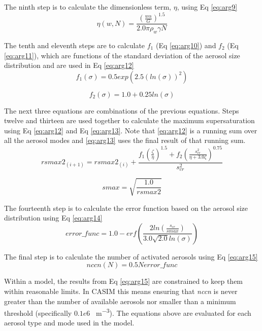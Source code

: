 The ninth step is to calculate the dimensionless term, $\eta$, using Eq \ref{eq:arg9}
\begin{equation} \label{eq:arg9}
\eta(w,N) = \frac{(\frac{w \alpha}{G})^{1.5}}{2.0 \pi \rho_w \gamma N}
\end{equation}

The tenth and eleventh steps are to calculate $f_1$ (Eq \ref{eq:arg10}) and $f_2$ (Eq \ref{eq:arg11}), which are functions of the standard deviation of the aerosol size distribution and are used in Eq \ref{eq:arg12}
\begin{equation} \label{eq:arg10}
f_1(\sigma) = 0.5 exp(2.5(ln(\sigma))^{2})
\end{equation}

\begin{equation} \label{eq:arg11}
f_2(\sigma) = 1.0 + 0.25ln(\sigma)
\end{equation}

The next three equations are combinations of the previous equations. Steps twelve and thirteen are used together to calculate the maximum supersaturation using Eq \ref{eq:arg12} and Eq \ref{eq:arg13}. Note that \ref{eq:arg12} is a running sum over all the aerosol modes and \ref{eq:arg13} uses the final result of that running sum.
\begin{equation} \label{eq:arg12}
rsmax2_{(i+1)} = rsmax2_{(i)} + \frac{f_1(\frac{\zeta}{\eta})^{1.5} + f_2(\frac{s_{cr}^{2}}{\eta + 3.0\zeta})^{0.75}}{s_{cr}^{2}}
\end{equation}

\begin{equation} \label{eq:arg13}
smax = \sqrt{\frac{1.0}{rsmax2}}
\end{equation}

The fourteenth step is to calculate the error function based on the aerosol size distribution using Eq \ref{eq:arg14}
\begin{equation} \label{eq:arg14}
error\_func = 1.0 - erf\left(\frac{2ln(\frac{s_{cr}}{smax})}{3.0\sqrt{2.0}ln(\sigma)}\right)
\end{equation}

The final step is to calculate the number of activated aerosols using Eq \ref{eq:arg15}
\begin{equation} \label{eq:arg15}
nccn(N) = 0.5 N error\_func
\end{equation}

Within a model, the results from Eq \ref{eq:arg15} are constrained to keep them within reasonable limits. In CASIM this means ensuring that \textit{nccn} is never greater than the number of available aerosols nor smaller than a minimum threshold (specifically $0.1e6$ \SI{}{m^{-3}}). The equations above are evaluated for each aerosol type and mode used in the model.

